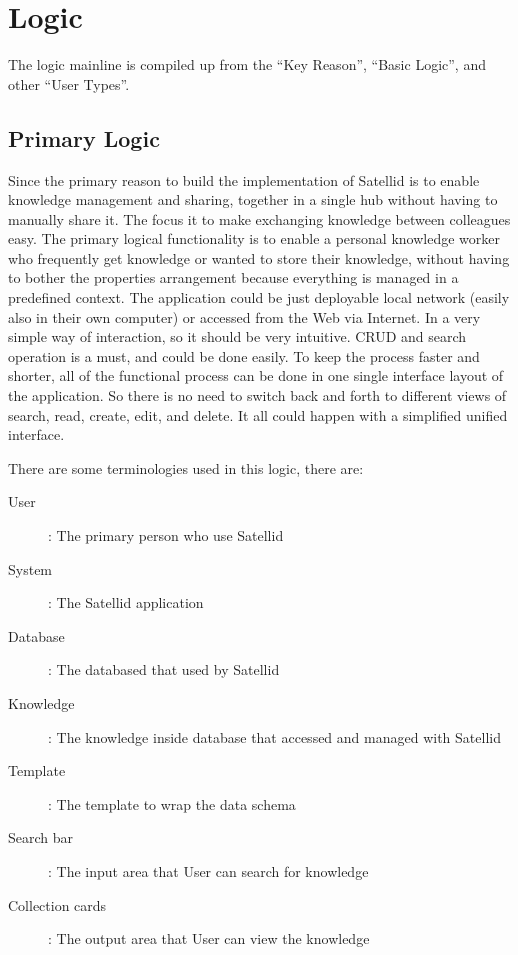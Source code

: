 \section{Logic}
\label{sec:logic}

The logic mainline is compiled up from the ``Key Reason'', ``Basic Logic'', and other ``User Types''.

\subsection{Primary Logic}

Since the primary reason to build the implementation of Satellid is to enable knowledge management and sharing, together in a single hub without having to manually share it.
The focus it to make exchanging knowledge between colleagues easy.
The primary logical functionality is to enable a personal knowledge worker who frequently get knowledge or wanted to store their knowledge, without having to bother the properties arrangement because everything is managed in a predefined context.
The application could be just deployable local network (easily also in their own computer) or accessed from the Web via Internet.
In a very simple way of interaction, so it should be very intuitive.
\ac{CRUD} and search operation is a must, and could be done easily.
To keep the process faster and shorter, all of the functional process can be done in one single interface layout of the application.
So there is no need to switch back and forth to different views of search, read, create, edit, and delete.
It all could happen with a simplified unified interface.

\noindent There are some terminologies used in this logic, there are:

\begin{description}
\item [User]: The primary person who use Satellid
\item [System]: The Satellid application
\item [Database]: The databased that used by Satellid
\item [Knowledge]: The knowledge inside database that accessed and managed with Satellid
\item [Template]: The template to wrap the data schema
\item [Search bar]: The input area that User can search for knowledge
\item [Collection cards]: The output area that User can view the knowledge
\end{description}

